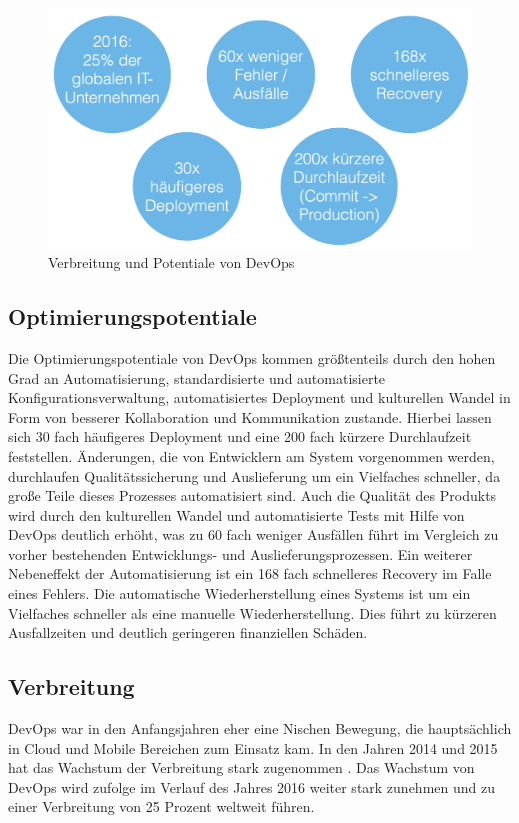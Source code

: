 \begin{figure}[ht]
  \centering
  \includegraphics[width=\textwidth]{img/devops_zahlen.png}
  \caption{Verbreitung und Potentiale von DevOps}
  \label{fig:devops_numbers}
\end{figure}

\subsection{Optimierungspotentiale}
Die Optimierungspotentiale von DevOps kommen größtenteils durch den hohen Grad an Automatisierung, standardisierte und automatisierte Konfigurationsverwaltung, automatisiertes Deployment und kulturellen Wandel in Form von besserer Kollaboration und Kommunikation zustande. 
Hierbei lassen sich 30 fach häufigeres Deployment und eine 200 fach kürzere Durchlaufzeit feststellen. 
Änderungen, die von Entwicklern am System vorgenommen werden, durchlaufen Qualitätssicherung und Auslieferung um ein Vielfaches schneller, da große Teile dieses Prozesses automatisiert sind. 
Auch die Qualität des Produkts wird durch den kulturellen Wandel und automatisierte Tests mit Hilfe von DevOps deutlich erhöht, was zu 60 fach weniger Ausfällen führt im Vergleich zu vorher bestehenden Entwicklungs- und Auslieferungsprozessen. 
Ein weiterer Nebeneffekt der Automatisierung ist ein 168 fach schnelleres Recovery im Falle eines Fehlers. 
Die automatische Wiederherstellung eines Systems ist um ein Vielfaches schneller als eine manuelle Wiederherstellung. 
Dies führt zu kürzeren Ausfallzeiten und deutlich geringeren finanziellen Schäden. 
\parencite[Vgl.][S. 10]{DevOpsSODR:2015}

\subsection{Verbreitung}
DevOps war in den Anfangsjahren eher eine Nischen Bewegung, die hauptsächlich in Cloud und Mobile Bereichen zum Einsatz kam. 
In den Jahren 2014 und 2015 hat das Wachstum der Verbreitung stark zugenommen \parencite[vgl.][S. 7]{DevOpsSODR:2014, DevOpsSODR:2015}. 
Das Wachstum von DevOps wird \parencite[][]{Gartner:2015} zufolge im Verlauf des Jahres 2016 weiter stark zunehmen und zu einer Verbreitung von 25 Prozent weltweit führen.

